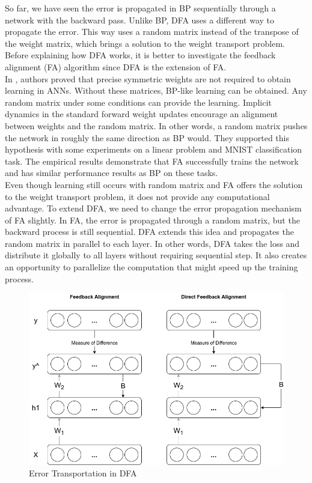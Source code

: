 \documentclass[a4paper, nobind]{templates/ociamthesis}
\begin{document}
So far, we have seen the error is propagated in BP sequentially through a network with the backward pass. Unlike BP, DFA uses a different way to propagate the error. This way uses a random matrix instead of the transpose of the weight matrix, which brings a solution to the weight transport problem. Before explaining how DFA works, it is better to investigate the feedback alignment (FA) algorithm since DFA is the extension of FA.\\
In \cite{lillicrap2014random}, authors proved that precise symmetric weights are not required to obtain learning in ANNs. Without these matrices, BP-like learning can be obtained. Any random matrix under some conditions can provide the learning. Implicit dynamics in the standard forward weight updates encourage an alignment between weights and the random matrix. In other words, a random matrix pushes the network in roughly the same direction as BP would. They supported this hypothesis with some experiments on a linear problem and MNIST classification task. The empirical results demonstrate that FA successfully trains the network and has similar performance results as BP on these tasks.\\
Even though learning still occurs with random matrix and FA offers the solution to the weight transport problem, it does not provide any computational advantage. To extend DFA, we need to change the error propagation mechanism of FA slightly. In FA, the error is propagated through a random matrix, but the backward process is still sequential. DFA extends this idea and propagates the random matrix in parallel to each layer. In other words, DFA takes the loss and distribute it globally to all layers without requiring sequential step. It also creates an opportunity to parallelize the computation that might speed up the training process.

\begin{figure}

{\centering \includegraphics[width=0.65\linewidth]{figures/1_DFA_Error} 

}

\caption{Error Transportation in DFA}\label{fig:DFA-Error}
\end{figure}
\end{document}
